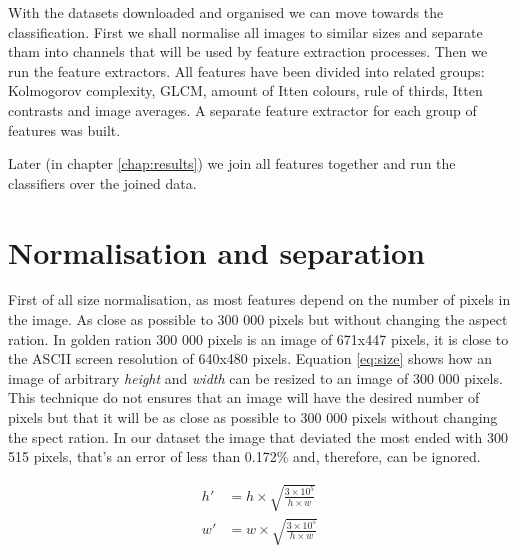 \documentclass[11pt,a4paper,draft]{report}
\begin{document}
\begin{multicols}{2}

With the datasets downloaded and organised we can move towards the
classification.  First we shall normalise all images to similar sizes and
separate tham into channels that will be used by feature extraction processes.
Then we run the feature extractors.  All features have been divided into
related groups: Kolmogorov complexity, GLCM, amount of Itten colours, rule of
thirds, Itten contrasts and image averages.  A separate feature extractor for
each group of features was built.

Later (in chapter \ref{chap:results}) we join all features together and run the
classifiers over the joined data.

\section{Normalisation and separation}

First of all size normalisation, as most features depend on the number of
pixels in the image.  As close as possible to 300 000 pixels but without
changing the aspect ration.  In golden ration 300 000 pixels is an image of
671x447 pixels, it is close to the ASCII screen resolution of 640x480 pixels.
Equation \ref{eq:size} shows how an image of arbitrary \emph{height} and
\emph{width} can be resized to an image of 300 000 pixels.  This technique do
not ensures that an image will have the desired number of pixels but that it
will be as close as possible to 300 000 pixels without changing the spect
ration.  In our dataset the image that deviated the most ended with 300 515
pixels, that's an error of less than 0.172\% and, therefore, can be ignored.

%
%

\begin{equation}
\begin{aligned}
h'  &= h \times \sqrt{ \frac{3 \times 10^5}{h \times w} } \\
w'  &= w \times \sqrt{ \frac{3 \times 10^5}{h \times w} } \\
\label{eq:size}
\end{aligned}
\end{equation}


\end{multicols}
\end{document}
